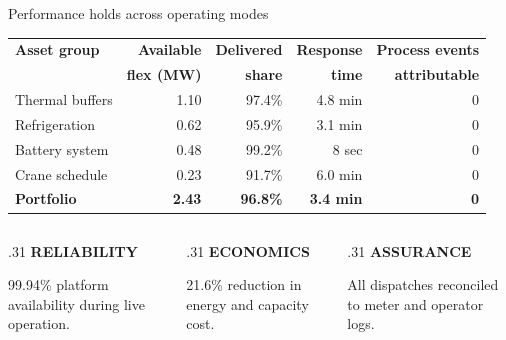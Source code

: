 \documentclass[10pt,aspectratio=169]{beamer}
\newcommand{\eyebrow}[1]{%
  {\color{SintefGreen}\bfseries\scriptsize\MakeUppercase{#1}}\par\vspace{1mm}%
}
\begin{document}
\begin{frame}{Performance holds across operating modes}
  \begin{table}
    \centering
    \small
    \setlength{\tabcolsep}{7pt}
    \begin{tabular}{lrrrr}
      \toprule
      \textbf{Asset group} & \textbf{Available} & \textbf{Delivered} &
        \textbf{Response} & \textbf{Process events} \\
      & \textbf{flex (MW)} & \textbf{share} & \textbf{time} & \textbf{attributable} \\
      \midrule
      Thermal buffers & 1.10 & 97.4\% & 4.8 min & 0 \\
      Refrigeration   & 0.62 & 95.9\% & 3.1 min & 0 \\
      Battery system  & 0.48 & 99.2\% & 8 sec   & 0 \\
      Crane schedule  & 0.23 & 91.7\% & 6.0 min & 0 \\
      \midrule
      \rowcolor{SintefLime!65}
      \textbf{Portfolio} & \textbf{2.43} & \textbf{96.8\%} & \textbf{3.4 min} & \textbf{0} \\
      \bottomrule
    \end{tabular}
  \end{table}
  \vspace{3mm}
  \begin{columns}[T,onlytextwidth]
    \begin{column}{.31\textwidth}
      \eyebrow{Reliability}
      99.94\% platform availability during live operation.
    \end{column}
    \begin{column}{.31\textwidth}
      \eyebrow{Economics}
      21.6\% reduction in energy and capacity cost.
    \end{column}
    \begin{column}{.31\textwidth}
      \eyebrow{Assurance}
      All dispatches reconciled to meter and operator logs.
    \end{column}
  \end{columns}
\end{frame}
\end{document}
